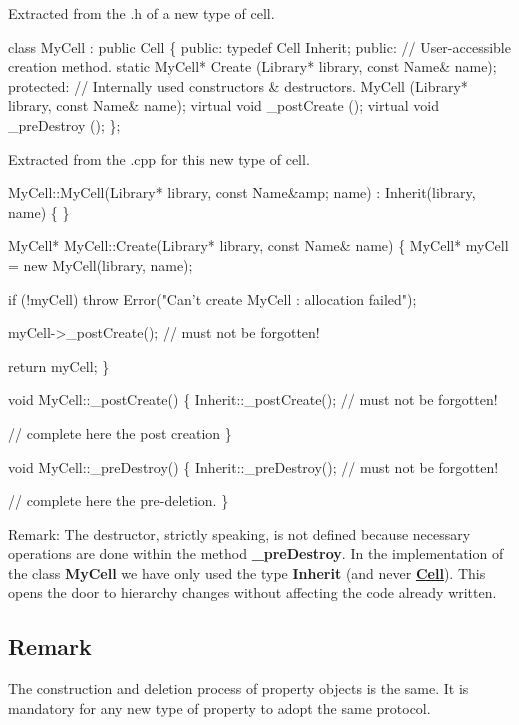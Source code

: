Extracted from the .h of a new type of cell. 
\begin{DoxyCode}
\textcolor{keyword}{class }MyCell : \textcolor{keyword}{public} Cell \{
  \textcolor{keyword}{public}:  
    \textcolor{keyword}{typedef}  Cell  Inherit;
  \textcolor{keyword}{public}:
    \textcolor{comment}{// User-accessible creation method.}
    \textcolor{keyword}{static}  MyCell* Create      (Library* library, \textcolor{keyword}{const} Name& name);
  \textcolor{keyword}{protected}:
    \textcolor{comment}{// Internally used constructors & destructors. }
                    MyCell      (Library* library, \textcolor{keyword}{const} Name& name);
    \textcolor{keyword}{virtual} \textcolor{keywordtype}{void}    \_postCreate ();
    \textcolor{keyword}{virtual} \textcolor{keywordtype}{void}    \_preDestroy ();
\};
\end{DoxyCode}
 Extracted from the .cpp for this new type of cell. 
\begin{DoxyCode}
MyCell::MyCell(Library* library, \textcolor{keyword}{const} Name&amp; name)
  : Inherit(library, name)
\{ \}
 

MyCell* MyCell::Create(Library* library, \textcolor{keyword}{const} Name& name)
\{
  MyCell* myCell = \textcolor{keyword}{new} MyCell(library, name);
 
  \textcolor{keywordflow}{if} (!myCell) \textcolor{keywordflow}{throw} Error(\textcolor{stringliteral}{"Can't create MyCell : allocation failed"});
 
  myCell->\_postCreate(); \textcolor{comment}{// must not be forgotten!}
 
  \textcolor{keywordflow}{return} myCell;
\}
 

\textcolor{keywordtype}{void}  MyCell::\_postCreate()
\{
   Inherit::\_postCreate(); \textcolor{comment}{// must not be forgotten!}
 
   \textcolor{comment}{// complete here the post creation}
\}
 

\textcolor{keywordtype}{void}  MyCell::\_preDestroy()
\{
   Inherit::\_preDestroy(); \textcolor{comment}{// must not be forgotten!}
 
   \textcolor{comment}{// complete here the pre-deletion.}
\}
\end{DoxyCode}


\begin{DoxyParagraph}{Remark\+: The destructor, strictly speaking, is not defined because}
necessary operations are done within the method {\bfseries \+\_\+pre\+Destroy}. In the implementation of the class {\bfseries My\+Cell} we have only used the type {\bfseries Inherit} (and never {\bfseries \mbox{\hyperlink{classHurricane_1_1Cell}{Cell}}}). This opens the door to hierarchy changes without affecting the code already written.
\end{DoxyParagraph}
\hypertarget{classHurricane_1_1DBo_sDBoRemark}{}\subsection{Remark}\label{classHurricane_1_1DBo_sDBoRemark}
The construction and deletion process of property objects is the same. It is mandatory for any new type of property to adopt the same protocol. 


